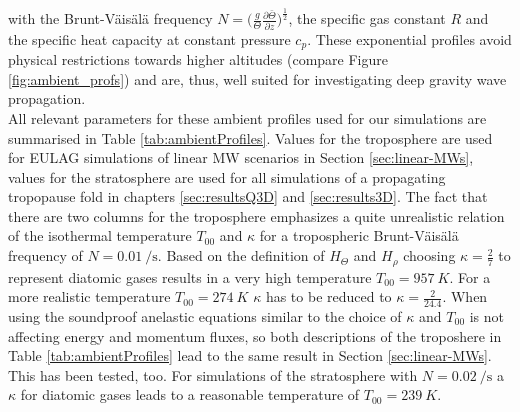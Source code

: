 with the Brunt-Väisälä frequency $N=\bigl(\frac{g}{\Theta}\frac{\partial \bar{\Theta}}{\partial z}\bigr)^{\frac{1}{2}}$, the specific gas constant $R$ and the specific heat capacity at constant pressure $c_p$. These exponential profiles avoid physical restrictions towards higher altitudes (compare Figure \ref{fig:ambient_profs}) and are, thus, well suited for investigating deep gravity wave propagation. \\
All relevant parameters for these ambient profiles used for our simulations are summarised in Table \ref{tab:ambientProfiles}. Values for the troposphere are used for EULAG simulations of linear MW scenarios in Section \ref{sec:linear-MWs}, values for the stratosphere are used for all simulations of a propagating tropopause fold in chapters \ref{sec:resultsQ3D} and \ref{sec:results3D}. The fact that there are two columns for the troposphere emphasizes a quite unrealistic relation of the isothermal temperature $T_{00}$ and $\kappa$ for a tropospheric Brunt-Väisälä frequency of $N=\SI{0.01}{\per\second}$. Based on the definition of $H_{\Theta}$ and $H_{\rho}$ choosing $\kappa=\frac{2}{7}$ to represent diatomic gases results in a very high temperature $T_{00} = \SI{957}{K}$. For a more realistic temperature $T_{00} = \SI{274}{K}$ $\kappa$ has to be reduced to $\kappa=\frac{2}{24.4}$. When using the soundproof anelastic equations similar to \textcite[]{lipps_scale_1982} the choice of $\kappa$ and $T_{00}$ is not affecting energy and momentum fluxes, so both descriptions of the troposhere in Table \ref{tab:ambientProfiles} lead to the same result in Section \ref{sec:linear-MWs}. This has been tested, too. For simulations of the stratosphere with $N=\SI{0.02}{\per\second}$ a $\kappa$ for diatomic gases leads to a reasonable temperature of $T_{00} = \SI{239}{K}$.
